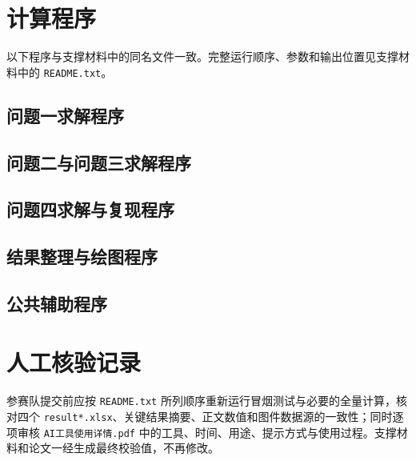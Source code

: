 \documentclass[withoutpreface,bwprint]{cumcmthesis}
\begin{document}
\begin{appendices}
\section{计算程序}

以下程序与支撑材料中的同名文件一致。完整运行顺序、参数和输出位置见支撑材料中的 \texttt{README.txt}。

\subsection{问题一求解程序}


\subsection{问题二与问题三求解程序}


\subsection{问题四求解与复现程序}



\subsection{结果整理与绘图程序}







\subsection{公共辅助程序}






\section{人工核验记录}

参赛队提交前应按 \texttt{README.txt} 所列顺序重新运行冒烟测试与必要的全量计算，核对四个 \texttt{result*.xlsx}、关键结果摘要、正文数值和图件数据源的一致性；同时逐项审核 \texttt{AI工具使用详情.pdf} 中的工具、时间、用途、提示方式与使用过程。支撑材料和论文一经生成最终校验值，不再修改。

\end{appendices}
\fi
\end{document}
